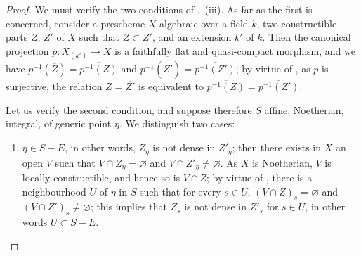 \begin{proof}
We must verify the two conditions of ,~(iii).
As far as the first is concerned, consider a prescheme $X$ algebraic over a field $k$, two constructible parts $Z$, $Z'$ of $X$ such that $Z\subset Z'$, and an extension $k'$ of $k$.
Then the canonical projection $p:X_{(k')}\to X$ is a faithfully flat and quasi-compact morphism, and we have $p^{-1}(\overline{Z})=\overline{p^{-1}(Z)}$ and $p^{-1}(\overline{Z'})=\overline{p^{-1}(Z')}$; by virtue of , as $p$ is surjective, the relation $\overline{Z}=\overline{Z'}$ is equivalent to $\overline{p^{-1}(Z)}=\overline{p^{-1}(Z')}$.

Let us verify the second condition, and suppose therefore $S$ affine, Noetherian, integral, of generic point $\eta$.
We distinguish two cases:
\begin{enumerate}[label=\upshape{$\arabic{enumi}^\circ$}]
  \item $\eta\in S-E$, in other words, $Z_\eta$ is not dense in $Z'_\eta$; then there exists in $X$ an open $V$ such that $V\cap Z_\eta=\varnothing$ and $V\cap Z'_\eta\neq\varnothing$.
  As $X$ is Noetherian, $V$ is locally constructible, and hence so is $V\cap Z$; by virtue of , there is a neighbourhood $U$ of $\eta$ in $S$ such that for every $s\in U$, $(V\cap Z)_s=\varnothing$ and $(V\cap Z')_s\neq\varnothing$; this implies that $Z_s$ is not dense in $Z'_s$ for $s\in U$, in other words $U\subset S-E$.



\end{enumerate}
\end{proof}
